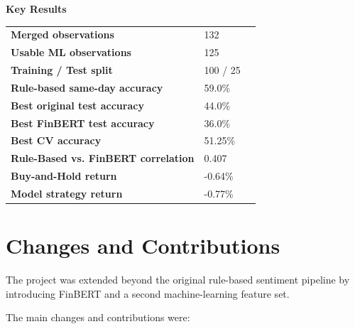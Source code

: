 \documentclass[10pt,a4paper]{article}
\begin{document}
	\begin{keybox}
		\textbf{\color{Navy}Key Results}
		
		\smallskip
		
		\begin{tabular}{@{}lll@{}}
			\textbf{Merged observations} & 132 & \\
			\textbf{Usable ML observations} & 125 & \\
			\textbf{Training / Test split} & 100 / 25 & \\
			\textbf{Rule-based same-day accuracy} & 59.0\% & \\
			\textbf{Best original test accuracy} & 44.0\% & \\
			\textbf{Best FinBERT test accuracy} & 36.0\% & \\
			\textbf{Best CV accuracy} & 51.25\% & \\
			\textbf{Rule-Based vs. FinBERT correlation} & 0.407 & \\
			\textbf{Buy-and-Hold return} & -0.64\% & \\
			\textbf{Model strategy return} & -0.77\% &
		\end{tabular}
	\end{keybox}
	
	\section{Changes and Contributions}
	
	The project was extended beyond the original rule-based sentiment
	pipeline by introducing FinBERT and a second machine-learning feature
	set.
	
	The main changes and contributions were:
	
\end{document}
